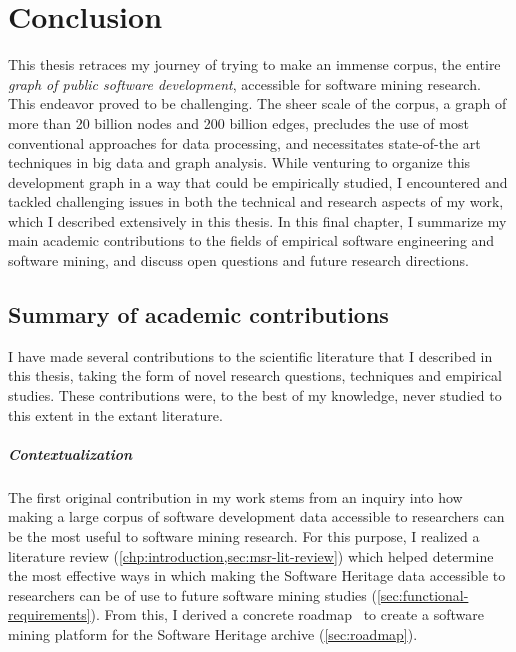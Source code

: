 \chapter{Conclusion}

This thesis retraces my journey of trying to make an immense corpus, the
entire \emph{graph of public software development}, accessible for software
mining research. This endeavor proved to be challenging. The sheer scale of the
corpus, a graph of more than 20 billion nodes and 200 billion edges, precludes
the use of most conventional approaches for data processing, and necessitates
state-of-the art techniques in big data and graph analysis.
While venturing to organize this development graph in a way that could be
empirically studied, I encountered and tackled challenging issues in both the
technical and research aspects of my work, which I described extensively in
this thesis. In this final chapter, I summarize my main academic contributions
to the fields of empirical software engineering and software mining, and
discuss open questions and future research directions.

\section{Summary of academic contributions}

I have made several contributions to the scientific literature that I described
in this thesis, taking the form of novel research questions, techniques and
empirical studies. These contributions were, to the best of my knowledge, never
studied to this extent in the extant literature.

\paragraph*{Contextualization}

The first original contribution in my work stems from an inquiry into how
making a large corpus of software development data accessible to researchers
can be the most useful to software mining research. For this purpose, I
realized a literature review (\cref{chp:introduction,sec:msr-lit-review}) which
helped determine the most effective ways in which making the Software Heritage
data accessible to researchers can be of use to future software mining studies
(\cref{sec:functional-requirements}). From this, I derived a concrete
roadmap~\cite{swh-benevol2018-universal-analysis} to create a software mining
platform for the Software Heritage archive (\cref{sec:roadmap}).


